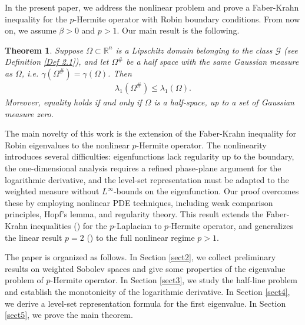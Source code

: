 \documentclass[11pt,leqno]{amsart}
\newtheorem{theorem}{Theorem}[section]\newtheorem{thm}[theorem]{Theorem}
\def\R{\mathbb{R}}
\numberwithin{equation}{section}
\begin{document}
In the present paper, we address the  nonlinear problem and prove a Faber-Krahn inequality for the $p$-Hermite operator with Robin boundary conditions. From now on,  we assume $\beta>0$ and $p>1$. Our main result is the following. 
\begin{theorem}\label{thm1}
    Suppose $\Omega\subset \R^n$ is a Lipschitz domain belonging to the class 
 $\mathcal G$ (see Definition \ref{Def 2.1}), and let $\Omega^{\#}$ be a half space with the same Gaussian measure as $\Omega$, i.e. $\gamma (\Omega^{\#})=\gamma (\Omega)$. 
Then 
    \begin{align}\label{eigenvalue comparison}
        \lambda_{1}(\Omega^{\#})\leq \lambda_{1}(\Omega).
    \end{align}
Moreover, equality holds if and only if  $\Omega$ is a half-space, up to a set of Gaussian measure zero.
\end{theorem}



The main novelty of this work is the extension of the Faber-Krahn inequality for Robin eigenvalues to the nonlinear $p$-Hermite operator. The nonlinearity introduces several difficulties: eigenfunctions lack regularity up to the boundary, the one-dimensional analysis requires a refined phase-plane argument for the logarithmic derivative, and the level-set representation must be adapted to the weighted measure without $L^\infty$-bounds on the eigenfunction. Our proof overcomes these by employing nonlinear PDE techniques, including weak comparison principles, Hopf's lemma, and regularity theory. This result extends  the  Faber-Krahn inequalities (\cite{BucurCV, Daiqiuyi}) for the $p$-Laplacian to $p$-Hermite operator,  and generalizes  the linear result $p=2$ (\cite{ChiacchioMathann}) to  the full nonlinear regime $p>1$.




The paper is organized as follows. In Section \ref{sect2}, we collect preliminary results on weighted Sobolev spaces and give some properties of  the  eigenvalue problem of $p$-Hermite operator.  In Section \ref{sect3}, we study the half-line problem and establish the monotonicity of the logarithmic derivative. In Section \ref{sect4}, we  derive a level-set representation formula for the first eigenvalue. In Section \ref{sect5}, we prove the main theorem.
\end{document}

